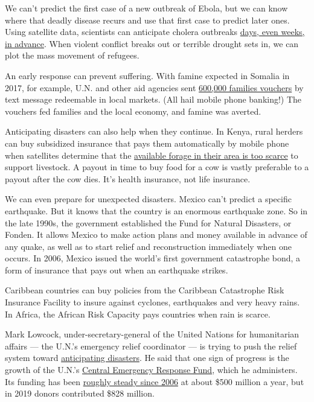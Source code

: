 We can't predict the first case of a new outbreak of Ebola, but we can
know where that deadly disease recurs and use that first case to predict
later ones. Using satellite data, scientists can anticipate cholera
outbreaks \href{https://www.bbc.com/news/health-45259922}{days, even
weeks, in advance}. When violent conflict breaks out or terrible drought
sets in, we can plot the mass movement of refugees.

An early response can prevent suffering. With famine expected in Somalia
in 2017, for example, U.N. and other aid agencies sent
\href{https://reliefweb.int/report/somalia/how-aid-cash-not-goods-averted-famine-somalia}{600,000
families vouchers} by text message redeemable in local markets. (All
hail mobile phone banking!) The vouchers fed families and the local
economy, and famine was averted.

Anticipating disasters can also help when they continue. In Kenya, rural
herders can buy subsidized insurance that pays them automatically by
mobile phone when satellites determine that the
\href{https://www.nytimes.com/2016/11/08/opinion/up-in-the-sky-help-to-keep-africans-from-starving.html}{available
forage in their area is too scarce} to support livestock. A payout in
time to buy food for a cow is vastly preferable to a payout after the
cow dies. It's health insurance, not life insurance.

We can even prepare for unexpected disasters. Mexico can't predict a
specific earthquake. But it knows that the country is an enormous
earthquake zone. So in the late 1990s, the government established the
Fund for Natural Disasters, or Fonden. It allows Mexico to make action
plans and money available in advance of any quake, as well as to start
relief and reconstruction immediately when one occurs. In 2006, Mexico
issued the world's first government catastrophe bond, a form of
insurance that pays out when an earthquake strikes.

Caribbean countries can buy policies from the Caribbean Catastrophe Risk
Insurance Facility to insure against cyclones, earthquakes and very
heavy rains. In Africa, the African Risk Capacity pays countries when
rain is scarce.

Mark Lowcock, under-secretary-general of the United Nations for
humanitarian affairs --- the U.N.'s emergency relief coordinator --- is
trying to push the relief system toward
\href{https://reliefweb.int/report/world/mark-lowcock-under-secretary-general-humanitarian-affairs-and-emergency-relief}{anticipating
disasters}. He said that one sign of progress is the growth of the
U.N.'s \href{https://cerf.un.org/}{Central Emergency Response Fund},
which he administers. Its funding has been
\href{https://cerf.un.org/our-donors/contributions}{roughly steady since
2006} at about \$500 million a year, but in 2019 donors contributed
\$828 million.

